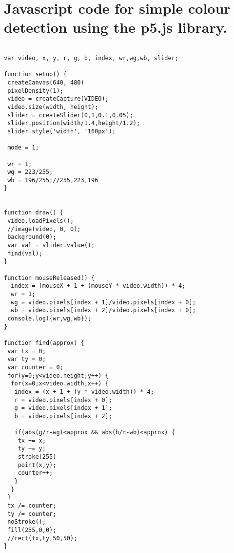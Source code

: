 \section{Javascript code for simple colour detection using the p5.js library.}
\lstset{language=Java}
\begin{lstlisting}

var video, x, y, r, g, b, index, wr,wg,wb, slider;

function setup() {
 createCanvas(640, 480)
 pixelDensity(1);
 video = createCapture(VIDEO);
 video.size(width, height);
 slider = createSlider(0,1,0.1,0.05);
 slider.position(width/1.4,height/1.2);
 slider.style('width', '160px');

 mode = 1;
 
 wr = 1;
 wg = 223/255;
 wb = 196/255;//255,223,196
}


function draw() {
 video.loadPixels();
 //image(video, 0, 0);
 background(0);
 var val = slider.value();
 find(val);
}

function mouseReleased() {
  index = (mouseX + 1 + (mouseY * video.width)) * 4;
  wr = 1;
  wg = video.pixels[index + 1]/video.pixels[index + 0];
  wb = video.pixels[index + 2]/video.pixels[index + 0];
 console.log({wr,wg,wb});
}

function find(approx) {
 var tx = 0;
 var ty = 0;
 var counter = 0;
 for(y=0;y<video.height;y++) {
  for(x=0;x<video.width;x++) {
   index = (x + 1 + (y * video.width)) * 4;
   r = video.pixels[index + 0];
   g = video.pixels[index + 1];
   b = video.pixels[index + 2];
   
   if(abs(g/r-wg)<approx && abs(b/r-wb)<approx) {
    tx += x;
    ty += y;
    stroke(255)
    point(x,y);
    counter++;
   }
  }
 }
 tx /= counter;
 ty /= counter;
 noStroke();
 fill(255,0,0);
 //rect(tx,ty,50,50);
}

\end{lstlisting}